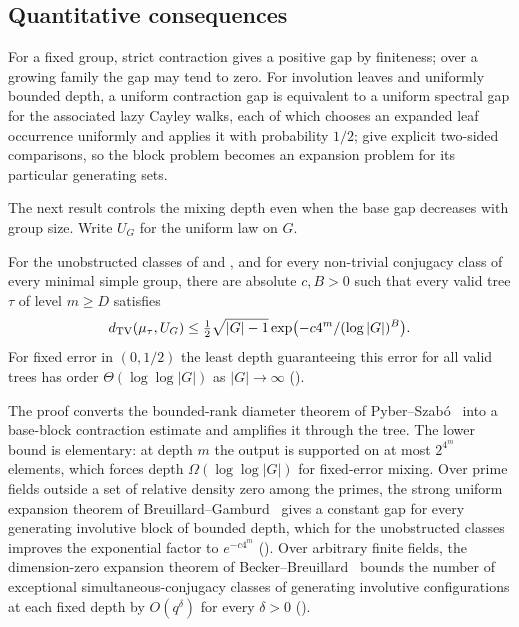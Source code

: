 \subsection*{Quantitative consequences}
For a fixed group, strict contraction gives a positive gap by finiteness;
over a growing family the gap may tend to zero. For involution leaves and
uniformly bounded depth, a uniform contraction gap is equivalent to a
uniform spectral gap for the associated lazy Cayley walks, each of which
chooses an expanded leaf occurrence uniformly and applies it with
probability $1/2$; 
give explicit two-sided comparisons, so the block problem becomes an
expansion problem for its particular generating sets.

The next result controls the mixing depth even when the base gap decreases
with group size. Write $U_G$ for the uniform law on $G$.

\begin{lettertheorem}
\label{ithm:E}
For the unobstructed classes of  and
, and for every non-trivial conjugacy class
of every minimal simple group, there are absolute $c,B>0$ such that every
valid tree $\tau$ of level $m\ge D$ satisfies
\[
 d_{\mathrm{TV}}(\mu_\tau,U_G)\le\tfrac12\sqrt{|G|-1}
                  \exp\bigl(-c4^m/(\log|G|)^B\bigr).
\]
For fixed error in $(0,1/2)$ the least depth guaranteeing this error for
all valid trees has order $\Theta(\log\log|G|)$ as $|G|\to\infty$
\textup{()}.
\end{lettertheorem}

The proof converts the bounded-rank diameter theorem of
Pyber--Szab\'o~\cite{PyberSzabo2016} into a base-block contraction estimate
and amplifies it through the tree. The lower bound is elementary: at depth
$m$ the output is supported on at most $2^{4^m}$ elements, which forces
depth $\Omega(\log\log|G|)$ for fixed-error mixing. Over prime fields
outside a set of relative density zero among the primes, the strong
uniform expansion theorem of Breuillard--Gamburd~\cite{BreuillardGamburd2010}
gives a constant gap for every generating involutive block of bounded
depth, which for the unobstructed classes improves the exponential factor
to $e^{-c4^m}$ (). Over arbitrary finite
fields, the dimension-zero expansion theorem of
Becker--Breuillard~\cite{BeckerBreuillard2026} bounds the number of
exceptional simultaneous-conjugacy classes of generating involutive
configurations at each fixed depth by $O(q^\delta)$ for every $\delta>0$
().


